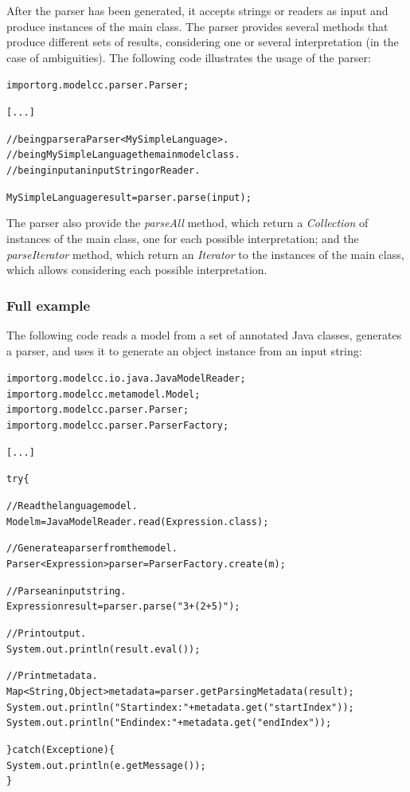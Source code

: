 \documentclass[a4paper,twoside,onecolumn]{article}
\newenvironment{colframe}{%
  \begin{Sbox} 
    \begin{minipage}{.8\columnwidth} 
}{%

  \end{minipage} 
  \end{Sbox} 
  \begin{center} 
    \fcolorbox{black}{MyGray}{\TheSbox} 
  \end{center} 
}
\begin{document}
After the parser has been generated, it accepts strings or readers as input and produce instances of the main class. The parser provides several methods that produce different sets of results, considering one or several interpretation (in the case of ambiguities). The following code illustrates the usage of the parser:

\begin{colframe}
\begin{alltt}
import org.modelcc.parser.Parser;

[...]

//being parser a Parser<MySimpleLanguage>.
//being MySimpleLanguage the main model class.
//being input an input String or Reader.

MySimpleLanguage result = parser.parse(input);
\end{alltt}
\end{colframe}

The parser also provide the \emph{parseAll} method, which return a \emph{Collection} of instances of the main class, one for each possible interpretation; and the \emph{parseIterator} method, which return an \emph{Iterator} to the instances of the main class, which allows considering each possible interpretation.

\subsubsection{Full example} \label{sec:fullexample}

The following code reads a model from a set of annotated Java classes, generates a parser, and uses it to generate an object instance from an input string:

\begin{colframe}
\begin{alltt}
import org.modelcc.io.java.JavaModelReader;
import org.modelcc.metamodel.Model;
import org.modelcc.parser.Parser;
import org.modelcc.parser.ParserFactory;

[...]

try \{

  // Read the language model.
  Model m = JavaModelReader.read(Expression.class);

  // Generate a parser from the model.
  Parser<Expression> parser = ParserFactory.create(m);

  // Parse an input string.
  Expression result = parser.parse("3+(2+5)");

  // Print output.
  System.out.println(result.eval());

  // Print metadata.
  Map<String,Object> metadata = parser.getParsingMetadata(result); 
  System.out.println("Start index: "+metadata.get("startIndex"));
  System.out.println("End index: "+metadata.get("endIndex"));

\} catch (Exception e) \{
  System.out.println(e.getMessage());
\}
\end{alltt}
\end{colframe}
\end{document}
